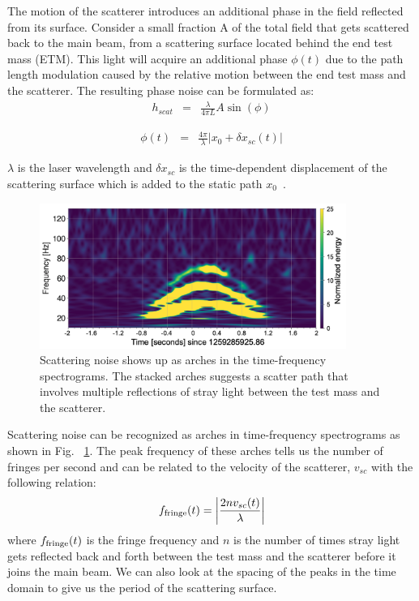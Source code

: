 \documentclass[12pt]{iopart}
\begin{document}
The motion of the scatterer introduces an additional phase in the field reflected from its surface. Consider a small fraction A of the total field that gets scattered back to the main beam, from a scattering surface located behind the end test mass (ETM). This light will acquire an additional phase ${\phi}(t)$ due to the path length modulation caused by the relative motion between the end test mass and the scatterer. The resulting phase noise can be formulated as:
\begin{eqnarray}
      h_{scat} & = & \frac{{\lambda}}{4{\pi}L}A\sin({\phi}) \label{eq:1}
\end{eqnarray}

\begin{eqnarray}
    {\phi}(t) & = & \frac{4{\pi}}{{\lambda}}\left|{ x_{0} + {\delta} x_{sc}(t)}\right| \label{eq:2}
\end{eqnarray}
    
${\lambda}$ is the laser wavelength and  $\delta x_{sc}$ is the time-dependent displacement of the scattering surface which is added to the static path $x_{0}$~\cite{scatvirgo}. 
\par

\begin{figure}[h]
    \centering
    \includegraphics[width=10cm]{scatindarmlrs1.png}
    \caption{Scattering noise shows up as arches in the time-frequency spectrograms. The stacked arches suggests a scatter path that involves multiple reflections of stray light between the test mass and the scatterer.}
    \label{fig:scat}
\end{figure}

Scattering noise can be recognized as arches in time-frequency spectrograms as shown in Fig. ~\ref{fig:scat}. The peak frequency of these arches tells us the number of fringes per second and can be related to the velocity of the scatterer, $v_{sc}$ with the following relation:
\begin{equation}
    f_{\rm fringe}(t) = \left|\frac{2nv_{sc}(t)}{\lambda}\right|  \label{eq:3}
\end{equation}
where $f_{\rm fringe}(t)$ is the fringe frequency and $n$ is the number of times stray light gets reflected back and forth between the test mass and the scatterer before it joins the main beam. We can also look at the spacing of the peaks in the time domain to give us the period of the scattering surface. 
\end{document}
